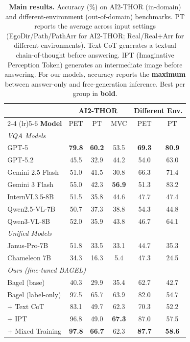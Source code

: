 \begin{table}[t]
  \caption{\textbf{Main results.} Accuracy (\%) on AI2-THOR (in-domain) and different-environment (out-of-domain) benchmarks. PT reports the average across input settings (EgoDir/Path/PathArr for AI2-THOR; Real/Real+Arr for different environments). Text CoT generates a textual chain-of-thought before answering. IPT (Imaginative Perception Token) generates an intermediate image before answering. For our models, accuracy reports the \textbf{maximum} between answer-only and free-generation inference. Best per group in \textbf{bold}.}
  \vspace{-1em}
  \centering
  \setlength{\tabcolsep}{13pt}
  \begin{tabular}{l ccc cc}
    \toprule
    & \multicolumn{3}{c}{\textbf{AI2-THOR}} & \multicolumn{2}{c}{\textbf{Different Env.}} \\
    \cmidrule(lr){2-4} \cmidrule(lr){5-6}
    \textbf{Model}
      & PET & \footnotesize PT & MVC
      & \footnotesize PET & \footnotesize PT \\
    \midrule
    \multicolumn{6}{l}{\emph{VQA Models}} \\
    GPT-5            & \textbf{79.8} & \textbf{60.2} & 53.5 & \textbf{69.3} & \textbf{80.9} \\
    GPT-5.2          & 45.5 & 32.9 & 44.2 & 54.0 & 63.0 \\
    Gemini 2.5 Flash & 51.0 & 41.5 & 30.8 & 66.3 & 71.4 \\
    Gemini 3 Flash   & 55.0 & 42.3 & \textbf{56.9} & 51.3 & 83.2 \\
    InternVL3.5-8B   & 51.5 & 35.8 & 44.6 & 47.7 & 47.4 \\
    Qwen2.5-VL-7B   & 50.7 & 37.3 & 38.8 & 54.3 & 44.8 \\
    Qwen3-VL-8B     & 52.0 & 35.9 & 43.8 & 46.7 & 64.1 \\
    \midrule
    \multicolumn{6}{l}{\emph{Unified Models}} \\
    Janus-Pro-7B     & 51.8 & 33.5 & 33.1 & 44.7 & 35.3 \\
    Chameleon 7B     & 34.3 & 16.3 & 5.4 & 47.3 & 24.5 \\
    \midrule
    \multicolumn{6}{l}{\emph{Ours (fine-tuned BAGEL)}} \\
    Bagel (base)              & 40.3 & 29.9 & 35.4 & 62.7 & 42.7 \\
    Bagel (label-only)        & 97.5 & 65.7 & 63.9 & 82.0 & 54.7 \\
    + Text CoT                 & 83.1 & 49.7 & 62.3 & 70.3 & 52.2 \\
    + IPT                       & 96.8 & 49.0 & \textbf{67.3} & 87.0 & 57.5 \\
    + Mixed Training            & \textbf{97.8} & \textbf{66.7} & 62.3 & \textbf{87.7} & \textbf{58.6} \\
    \bottomrule
  \end{tabular}
  \label{tab:main_results}
\end{table}
